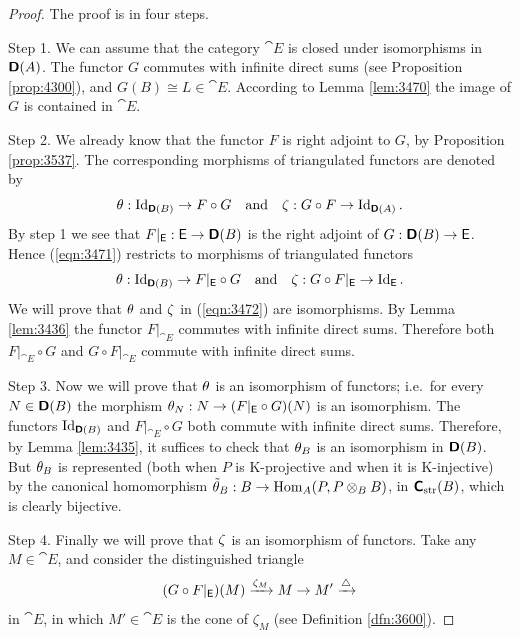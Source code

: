 \begin{proof} 
The proof is in four steps. 

\smallskip \noindent 
Step 1. We can assume that the category $\cat{E}$ is closed under isomorphisms 
in $\boldsymbol{\mathsf{D}}(A)$. The functor $G$ commutes with infinite direct sums (see 
Proposition \ref{prop:4300}), 
and $G(B) \cong L \in \cat{E}$. According to Lemma \ref{lem:3470} the image of 
$G$ is contained in $\cat{E}$. 

\medskip \noindent 
Step 2. We already know that the functor $F$ is right adjoint to $G$, by 
Proposition \ref{prop:3537}. 
The corresponding morphisms of triangulated functors are denoted by
\begin{equation} \label{eqn:3471}
\theta : \operatorname{Id}_{\boldsymbol{\mathsf{D}}(B)} \to F \circ G \quad \textup{and} \quad
\zeta : G \circ F \to \operatorname{Id}_{\boldsymbol{\mathsf{D}}(A)} . 
\end{equation}
By step 1 we see that  
$F|_{\operatorname{\mathsf{E}}} : \operatorname{\mathsf{E}} \to \boldsymbol{\mathsf{D}}(B)$ 
is the right adjoint of 
$G : \boldsymbol{\mathsf{D}}(B) \to \operatorname{\mathsf{E}}$.
Hence (\ref{eqn:3471}) restricts to morphisms of triangulated functors
\begin{equation} \label{eqn:3472}
\theta : \operatorname{Id}_{\boldsymbol{\mathsf{D}}(B)} \to F|_{\operatorname{\mathsf{E}}} \circ G \quad \textup{and} \quad
\zeta : G \circ F|_{\operatorname{\mathsf{E}}} \to \operatorname{Id}_{\operatorname{\mathsf{E}}}  . 
\end{equation}
We will prove that $\theta$ and $\zeta$ in (\ref{eqn:3472}) are isomorphisms. 
By Lemma \ref{lem:3436} the functor $F|_{\cat{E}}$ commutes with infinite 
direct sums. Therefore both $F|_{\cat{E}} \circ G$ and 
$G \circ F|_{\cat{E}}$ commute with infinite direct sums.

\medskip \noindent 
Step 3. Now we will prove that $\theta$ is an isomorphism of functors; i.e.\
for every $N \in \boldsymbol{\mathsf{D}}(B)$ the morphism
$\theta_N :  N \to (F|_{\operatorname{\mathsf{E}}} \circ G) (N)$ 
is an isomorphism. The functors $\operatorname{Id}_{\boldsymbol{\mathsf{D}}(B)}$ and 
$F|_{\cat{E}} \circ G$ both commute with infinite direct sums.
Therefore, by Lemma \ref{lem:3435}, 
it suffices to check that $\theta_B$ is an isomorphism in $\boldsymbol{\mathsf{D}}(B)$. 
But $\theta_B$ is represented (both when $P$ is K-projective and when it is  
K-injective) by the canonical homomorphism 
$\tilde{\theta}_B : B \to \operatorname{Hom}_{A}(P, P \otimes_B B)$,
in $\boldsymbol{\mathsf{C}}_{\mathrm{str}}(B)$, 
which is clearly bijective. 

\medskip \noindent 
Step 4. Finally we will prove that $\zeta$ is an isomorphism of functors. 
Take any $M \in \cat{E}$, and 
consider the distinguished triangle
\begin{equation} \label{eqn:3473}
(G \circ F|_{\operatorname{\mathsf{E}}})(M) \xrightarrow{\zeta_{M}} M \to M' \xrightarrow{\triangle}
\end{equation}
in $\cat{E}$, in which $M' \in \cat{E}$ is the cone of $\zeta_{M}$
(see Definition \ref{dfn:3600}).


\end{proof}
